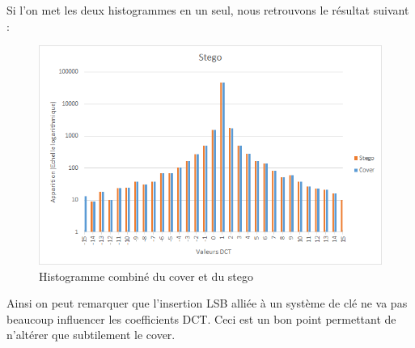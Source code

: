 Si l'on met les deux histogrammes en un seul, nous retrouvons le résultat suivant :
\begin{figure}[H]
    \centering
    \includegraphics[width=.7\textwidth]{img/both_histo.png}
    \caption{Histogramme combiné du cover et du stego}
    \label{img:15}
\end{figure}
Ainsi on peut remarquer que l'insertion LSB alliée à un système de clé ne va pas beaucoup influencer les coefficients DCT. Ceci est un bon point permettant de n'altérer que subtilement le cover.